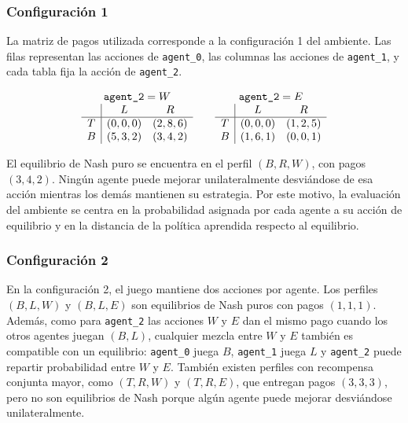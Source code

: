 \documentclass[letterpaper,12pt]{article} %
\begin{document}
\subsubsection*{Configuración 1}

La matriz de pagos utilizada corresponde a la configuración 1 del ambiente. Las filas representan las acciones de \texttt{agent\_0}, las columnas las acciones de \texttt{agent\_1}, y cada tabla fija la acción de \texttt{agent\_2}.

\[
\begin{array}{c|cc}
\multicolumn{3}{c}{\texttt{agent\_2} = W} \\
 & L & R \\
\hline
T & (0,0,0) & (2,8,6) \\
B & (5,3,2) & (3,4,2)
\end{array}
\qquad
\begin{array}{c|cc}
\multicolumn{3}{c}{\texttt{agent\_2} = E} \\
 & L & R \\
\hline
T & (0,0,0) & (1,2,5) \\
B & (1,6,1) & (0,0,1)
\end{array}
\]

El equilibrio de Nash puro se encuentra en el perfil $(B,R,W)$, con pagos $(3,4,2)$. Ningún agente puede mejorar unilateralmente desviándose de esa acción mientras los demás mantienen su estrategia. Por este motivo, la evaluación del ambiente se centra en la probabilidad asignada por cada agente a su acción de equilibrio y en la distancia de la política aprendida respecto al equilibrio.

\subsubsection*{Configuración 2}

En la configuración 2, el juego mantiene dos acciones por agente. Los perfiles $(B,L,W)$ y $(B,L,E)$ son equilibrios de Nash puros con pagos $(1,1,1)$. Además, como para \texttt{agent\_2} las acciones $W$ y $E$ dan el mismo pago cuando los otros agentes juegan $(B,L)$, cualquier mezcla entre $W$ y $E$ también es compatible con un equilibrio: \texttt{agent\_0} juega $B$, \texttt{agent\_1} juega $L$ y \texttt{agent\_2} puede repartir probabilidad entre $W$ y $E$. También existen perfiles con recompensa conjunta mayor, como $(T,R,W)$ y $(T,R,E)$, que entregan pagos $(3,3,3)$, pero no son equilibrios de Nash porque algún agente puede mejorar desviándose unilateralmente.
\end{document}
